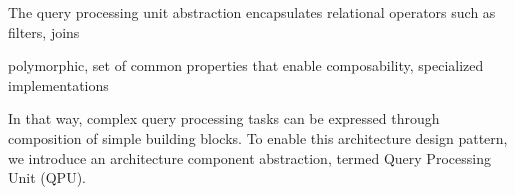 






The query processing unit abstraction encapsulates relational operators such as filters, joins 

polymorphic, set of common properties that enable composability, specialized implementations

In that way, complex query processing tasks can be expressed through composition of simple building blocks.
To enable this architecture design pattern, we introduce an architecture component abstraction, termed Query Processing
Unit (QPU).


